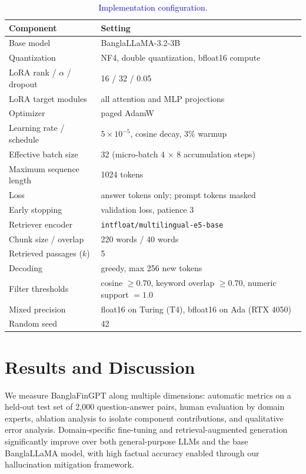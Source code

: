 \documentclass{article}
\newcommand{\revised}[1]{\textcolor{blue}{#1}}
\newcommand{\revised}[1]{#1}
\begin{document}
\begin{table}[!h]
\centering
\caption{\revised{Implementation configuration.}}
\label{tab:implementation}
\small
\begin{tabular}{ll}
\hline
\textbf{Component} & \textbf{Setting} \\
\hline
Base model & BanglaLLaMA-3.2-3B \\
Quantization & NF4, double quantization, bfloat16 compute \\
LoRA rank / $\alpha$ / dropout & 16 / 32 / 0.05 \\
LoRA target modules & all attention and MLP projections \\
Optimizer & paged AdamW \\
Learning rate / schedule & $5\times10^{-5}$, cosine decay, 3\% warmup \\
Effective batch size & 32 (micro-batch 4 $\times$ 8 accumulation steps) \\
Maximum sequence length & 1024 tokens \\
Loss & answer tokens only; prompt tokens masked \\
Early stopping & validation loss, patience 3 \\
Retriever encoder & \texttt{intfloat/multilingual-e5-base} \\
Chunk size / overlap & 220 words / 40 words \\
Retrieved passages ($k$) & 5 \\
Decoding & greedy, max 256 new tokens \\
Filter thresholds & cosine $\geq 0.70$, keyword overlap $\geq 0.70$, numeric support $= 1.0$ \\
Mixed precision & float16 on Turing (T4), bfloat16 on Ada (RTX 4050) \\
Random seed & 42 \\
\hline
\end{tabular}
\end{table}

\section{Results and Discussion}

We measure BanglaFinGPT along multiple dimensions: automatic metrics on a held-out test
set of 2,000 question-answer pairs, human evaluation by domain experts, ablation
analysis to isolate component contributions, and qualitative error analysis.
Domain-specific fine-tuning and retrieval-augmented generation significantly improve
over both general-purpose LLMs and the base BanglaLLaMA model, with high factual
accuracy enabled through our hallucination mitigation framework.
\end{document}
